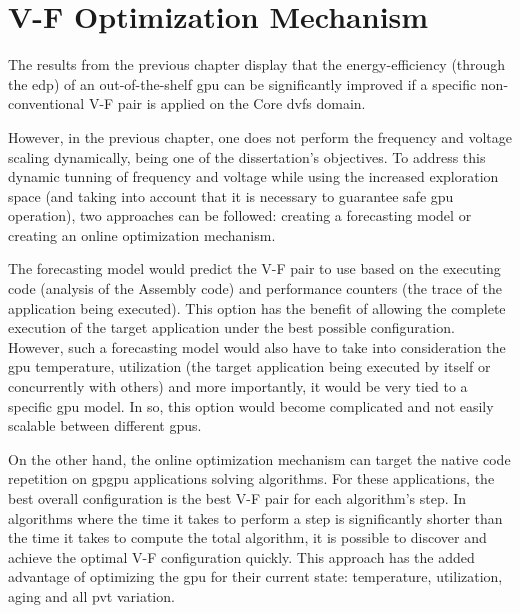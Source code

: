 
\chapter{V-F Optimization Mechanism}
\label{chapter:mech}


The results from the previous chapter display that the energy-efficiency (through the \acrshort{edp}) of an out-of-the-shelf \acrshort{gpu} can be significantly improved if a specific non-conventional V-F pair is applied on the Core \acrshort{dvfs} domain. 

However, in the previous chapter, one does not perform the frequency and voltage scaling dynamically, being one of the dissertation's objectives.
To address this dynamic tunning of frequency and voltage while using the increased exploration space (and taking into account that it is necessary to guarantee safe \acrshort{gpu} operation), two approaches can be followed: creating a forecasting model or creating an online optimization mechanism.

The forecasting model would predict the V-F pair to use based on the executing code (analysis of the Assembly code) and performance counters (the trace of the application being executed). This option has the benefit of allowing the complete execution of the target application under the best possible configuration. However, such a forecasting model would also have to take into consideration the \acrshort{gpu} temperature, utilization (the target application being executed by itself or concurrently with others) and more importantly, it would be very tied to a specific \acrshort{gpu} model. In so, this option would become complicated and not easily scalable between different \acrshort{gpu}s.

On the other hand, the online optimization mechanism can target the native code repetition on \acrshort{gpgpu} applications solving algorithms. For these applications, the best overall configuration is the best V-F pair for each algorithm's step. In algorithms where the time it takes to perform a step is significantly shorter than the time it takes to compute the total algorithm, it is possible to discover and achieve the optimal V-F configuration quickly. This approach has the added advantage of optimizing the \acrshort{gpu} for their current state: temperature, utilization, aging and all \acrshort{pvt} variation.

